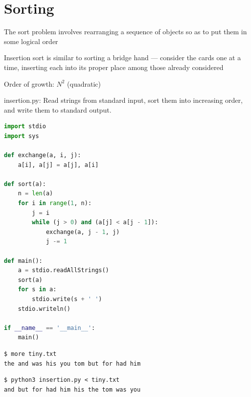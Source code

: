 \documentclass[8pt,a4paper,compress]{beamer}
\begin{document}
\section{Sorting}
\begin{frame}[fragile]
\pause

The sort problem involves rearranging a sequence of objects so as to put them in some logical order

\pause
\bigskip

Insertion sort is similar to sorting a bridge hand --- consider the cards one at a time, inserting each into its proper place among those already considered

\pause
\bigskip

Order of growth: $N^2$ (quadratic)
\end{frame}

\begin{frame}[fragile]
\pause

\begin{framed}
\tiny insertion.py: Read strings from standard input, sort them into increasing order, and write them to standard output.
\end{framed}

\begin{lstlisting}[language=python,style=focusin]
import stdio
import sys

def exchange(a, i, j):
    a[i], a[j] = a[j], a[i]

def sort(a):
    n = len(a)
    for i in range(1, n):
        j = i
        while (j > 0) and (a[j] < a[j - 1]):
            exchange(a, j - 1, j)
            j -= 1

def main():
    a = stdio.readAllStrings()
    sort(a)
    for s in a:
        stdio.write(s + ' ')
    stdio.writeln()

if __name__ == '__main__':
    main()
\end{lstlisting}

\pause

\begin{lstlisting}[language={},style=focusin]
$ more tiny.txt 
the and was his you tom but for had him
\end{lstlisting}

\pause

\begin{lstlisting}[language={},style=focusin]
$ python3 insertion.py < tiny.txt 
and but for had him his the tom was you 
\end{lstlisting}
\end{frame}
\end{document}
